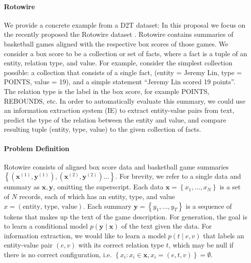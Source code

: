 \documentclass[11pt]{article}
\newcommand\set[1]{\left\{#1\right\}}
\newcommand{\bx}{\mathbf{x}}
\newcommand{\by}{\mathbf{y}}
\begin{document}

\paragraph{Rotowire}
We provide a concrete example from a D2T dataset:
In this proposal we focus on the recently proposed
the Rotowire dataset \citep{wiseman2017d2t}.
Rotowire contains summaries of basketball games aligned with the respective
box scores of those games.
We consider a box score to be a collection or set of facts,
where a fact is a tuple of an entity, relation type, and value.
For example, consider the simplest collection possible:
a collection that consists of a single fact, (entity = Jeremy Lin, type = POINTS, value = 19),
and a simple statement ``Jeremy Lin scored 19 points''.
The relation type is the label in the box score, for example POINTS, REBOUNDS, etc.
In order to automatically evaluate this summary,
we could use an information extraction system (IE) to extract entity-value pairs
from text,
predict the type of the relation between the entity and value,
and compare resulting tuple (entity, type, value) to the given collection of facts.

\paragraph{Problem Definition}
Rotowire consists of aligned box score data and basketball game summaries
$\set{(\bx^{(1)}, \by^{(1)}),(\bx^{(2)},\by^{(2)})\ldots}$.
For brevity, we refer to a single data and summary as $\bx,\by$, omitting the superscript.
Each data $\bx = \set{x_1,\ldots,x_N}$ is a set of $N$ records, each of which has
an entity, type, and value $x = (\text{entity, type, value})$.
Each summary $\by = \set{y_1,\ldots,y_T}$ is a sequence of tokens that makes up the
text of the game description.
For generation, the goal is to learn a conditional model $p(\by\mid\bx)$ of the text given the data.
For information extraction, we would like to learn a model $p(t\mid e,v)$ that labels an entity-value pair $(e,v)$
with its correct relation type $t$, which may be null if there is no correct configuration, i.e.
$\set{x_i:x_i\in\bx, x_i = (e,t,v)}=\emptyset$.
\end{document}
